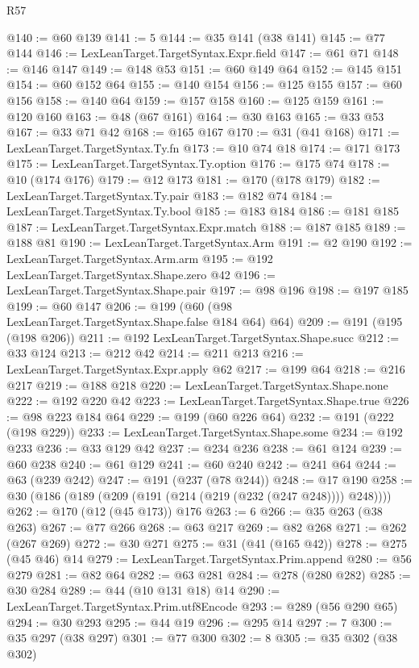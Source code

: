 \begin{lexlean}{R57}
\begin{coremodule}
@140 := @60 @139
@141 := 5
@144 := @35 @141 (@38 @141)
@145 := @77 @144
@146 := LexLeanTarget.TargetSyntax.Expr.field
@147 := @61 @71
@148 := @146 @147
@149 := @148 @53
@151 := @60 @149 @64
@152 := @145 @151
@154 := @60 @152 @64
@155 := @140 @154
@156 := @125 @155
@157 := @60 @156
@158 := @140 @64
@159 := @157 @158
@160 := @125 @159
@161 := @120 @160
@163 := @48 (@67 @161)
@164 := @30 @163
@165 := @33 @53
@167 := @33 @71 @42
@168 := @165 @167
@170 := @31 (@41 @168)
@171 := LexLeanTarget.TargetSyntax.Ty.fn
@173 := @10 @74 @18
@174 := @171 @173
@175 := LexLeanTarget.TargetSyntax.Ty.option
@176 := @175 @74
@178 := @10 (@174 @176)
@179 := @12 @173
@181 := @170 (@178 @179)
@182 := LexLeanTarget.TargetSyntax.Ty.pair
@183 := @182 @74
@184 := LexLeanTarget.TargetSyntax.Ty.bool
@185 := @183 @184
@186 := @181 @185
@187 := LexLeanTarget.TargetSyntax.Expr.match
@188 := @187 @185
@189 := @188 @81
@190 := LexLeanTarget.TargetSyntax.Arm
@191 := @2 @190
@192 := LexLeanTarget.TargetSyntax.Arm.arm
@195 := @192 LexLeanTarget.TargetSyntax.Shape.zero @42
@196 := LexLeanTarget.TargetSyntax.Shape.pair
@197 := @98 @196
@198 := @197 @185
@199 := @60 @147
@206 := @199 (@60 (@98 LexLeanTarget.TargetSyntax.Shape.false @184 @64) @64)
@209 := @191 (@195 (@198 @206))
@211 := @192 LexLeanTarget.TargetSyntax.Shape.succ
@212 := @33 @124
@213 := @212 @42
@214 := @211 @213
@216 := LexLeanTarget.TargetSyntax.Expr.apply @62
@217 := @199 @64
@218 := @216 @217
@219 := @188 @218
@220 := LexLeanTarget.TargetSyntax.Shape.none
@222 := @192 @220 @42
@223 := LexLeanTarget.TargetSyntax.Shape.true
@226 := @98 @223 @184 @64
@229 := @199 (@60 @226 @64)
@232 := @191 (@222 (@198 @229))
@233 := LexLeanTarget.TargetSyntax.Shape.some
@234 := @192 @233
@236 := @33 @129 @42
@237 := @234 @236
@238 := @61 @124
@239 := @60 @238
@240 := @61 @129
@241 := @60 @240
@242 := @241 @64
@244 := @63 (@239 @242)
@247 := @191 (@237 (@78 @244))
@248 := @17 @190
@258 := @30 (@186 (@189 (@209 (@191 (@214 (@219 (@232 (@247 @248)))) @248))))
@262 := @170 (@12 (@45 @173)) @176
@263 := 6
@266 := @35 @263 (@38 @263)
@267 := @77 @266
@268 := @63 @217
@269 := @82 @268
@271 := @262 (@267 @269)
@272 := @30 @271
@275 := @31 (@41 (@165 @42))
@278 := @275 (@45 @46) @14
@279 := LexLeanTarget.TargetSyntax.Prim.append
@280 := @56 @279
@281 := @82 @64
@282 := @63 @281
@284 := @278 (@280 @282)
@285 := @30 @284
@289 := @44 (@10 @131 @18) @14
@290 := LexLeanTarget.TargetSyntax.Prim.utf8Encode
@293 := @289 (@56 @290 @65)
@294 := @30 @293
@295 := @44 @19
@296 := @295 @14
@297 := 7
@300 := @35 @297 (@38 @297)
@301 := @77 @300
@302 := 8
@305 := @35 @302 (@38 @302)

\end{coremodule}
\end{lexlean}
